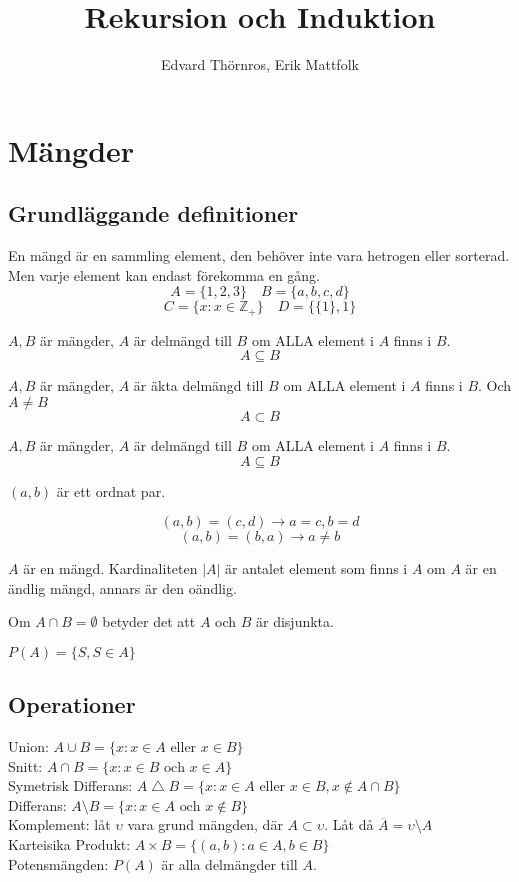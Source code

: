 \documentclass{article}
\title{Rekursion och Induktion}
\author{Edvard Thörnros, Erik Mattfolk}
\begin{document}
	\maketitle
	\newpage

	\section{Mängder}
	\subsection{Grundläggande definitioner}
	En mängd är en sammling element, den behöver inte vara hetrogen eller sorterad. Men varje element kan endast förekomma en gång.
	$$
		A = \{ 1, 2, 3 \}
		\quad
		B = \{ a, b, c, d\}
	$$
	$$
		C = \{x : x \in \mathbb{Z}_{+} \} 
		\quad
		D = \{ \{ 1 \}, 1\}
	$$

	$ A, B $ är mängder, $A$ är delmängd till $B$ om ALLA element i $A$ finns i $B$.
	$$ A \subseteq B $$

	$ A, B $ är mängder, $A$ är äkta delmängd till $B$ om ALLA element i $A$ finns i $B$. Och $A \not= B$
	$$ A \subset B $$

	$ A, B $ är mängder, $A$ är delmängd till $B$ om ALLA element i $A$ finns i $B$.
	$$ A \subseteq B $$

	$ (a, b) $ är ett ordnat par.

	$$ (a, b) = (c, d) \to a = c, b = d $$
	$$ (a, b) = (b, a) \to a \not= b $$

	$A$ är en mängd. Kardinaliteten $|A|$ är antalet element som finns i $A$ om $A$ är en ändlig mängd, annars är den oändlig.

	Om $A \cap B = \emptyset $ betyder det att $A$ och $B$ är disjunkta.
	
	\begin{center}
		$P(A) = \{S, S \in A\}$
	\end{center}

	\subsection{Operationer}
	Union: $ A \cup B = \{x : x \in A \text{ eller } x \in B\} $\\
	Snitt: $ A \cap B = \{x : x \in B \text{ och } x \in A\} $\\
	Symetrisk Differans: $ A \bigtriangleup B = \{x : x \in A \text{ eller } x \in B, x \not\in A \cap B \} $\\
	Differans: $ A \setminus B = \{x : x \in A \text{ och } x \not\in B \} $\\
	Komplement: låt $ \upsilon $ vara grund mängden, där $ A \subset \upsilon $. Låt då $ \overline{A} = \upsilon \setminus A $\\
	Karteisika Produkt: $A \times B = \{ (a, b) : a \in A, b \in B\} $\\
	Potensmängden: $P(A)$ är alla delmängder till $A$. \\
\end{document}

